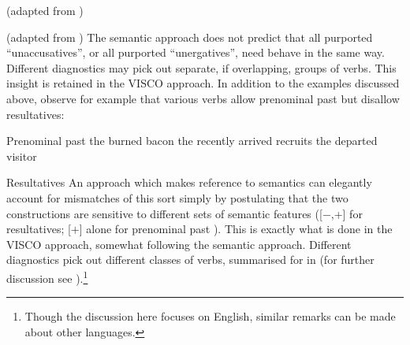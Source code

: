 \documentclass[output=paper]{langsci/langscibook}
\begin{document}
\ea\label{ex:19.35}  (adapted from \citealt[140]{Zaenen1993})
    \z
\z

\ea\label{ex:19.36}  (adapted from \citealt[131]{Zaenen1993})
    \z
\z
The semantic approach does not predict that all purported
\enquote{unaccusatives}, or all purported \enquote{unergatives}, need behave in
the same way. Different diagnostics may pick out separate, if overlapping,
groups of verbs. This insight is retained in the VISCO approach. In addition to
the examples discussed above, observe for example that various verbs allow
prenominal past  but disallow resultatives:

\ea Prenominal past 
    \ea the burned bacon
    \ex the recently arrived recruits
    \ex the departed visitor
    \z
\z

\ea Resultatives
    \z
\z
An approach which makes reference to semantics can elegantly account for
mismatches of this sort simply by postulating that the two constructions are
sensitive to different sets of semantic features ([$-$\Initiation{},+\Change{}] for
resultatives; [$+$\Change{}] alone for prenominal past ). This is
exactly what is done in the VISCO approach, somewhat following the semantic
approach. Different diagnostics pick out different classes of verbs, summarised
for  in  (for further discussion see
\citealt{Baker2018,Baker2019}).\footnote{Though the discussion here focuses on
English, similar remarks can be made about other languages.}
\end{document}
